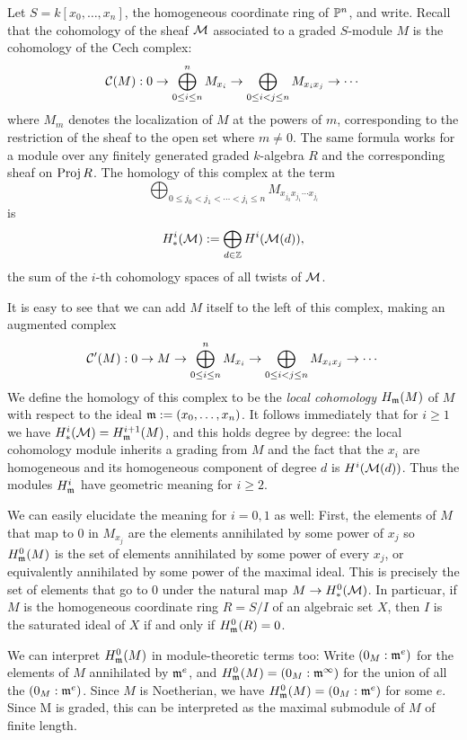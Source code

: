 Let $S= k[x_{0}, \dots, x_{n}]$, the homogeneous coordinate ring of $\PP^{n}$, and write. Recall that the cohomology of the sheaf $\cM$ associated to a graded $S$-module $M$ is the cohomology of the Cech complex:
$$
\cC(M): 0\to \bigoplus_{0\leq i \leq n}^{n} M_{x_{i}} \to \bigoplus_{0\leq i<j\leq n} M_{x_{i}x_{j}} \to \cdots
$$
where $M_{m}$ denotes the localization of $M$ at the powers of $m$, corresponding to the restriction of the sheaf to the open set where $m \neq 0$. The same formula works for a module 
over any finitely generated graded $k$-algebra $R$ and the corresponding sheaf on $\Proj R$.
The homology of this complex at the term
$$
\bigoplus_{0\leq j_{0}<j_{1}<\cdots<j_{i}\leq n} M_{x_{j_{0}}x_{j_{1}}\cdots x_{j_{i}}}
$$
is 
$$
H^{i}_{*}(\cM):= \bigoplus_{d\in \ZZ} H^{i}(\cM(d)),
$$
the sum of the $i$-th cohomology spaces of all twists of $\cM$.

It is easy to see that we can add $M$ itself to the left of this complex, making an augmented complex
$$
\cC'(M): 0\to M \to \bigoplus_{0\leq i \leq n}^{n} M_{x_{i}} \to \bigoplus_{0\leq i<j\leq n} M_{x_{i}x_{j}} \to \cdots
$$
We define the homology of this complex to be the \emph{local cohomology} $H_{\gm}(M)$ of $M$ with respect to the ideal $\gm := (x_{0},\dots,x_{n})$. It follows immediately that for $i\geq 1$ we have
$H^{i}_{*}(\cM) = H^{i+1}_{\gm}(M)$, and this holds degree by degree: the local cohomology module inherits a grading from $M$ and the fact that the $x_{i}$ are homogeneous and its homogeneous component of degree $d$ is
$H^{i}(\cM(d))$. Thus the modules $H_{\gm}^{i}$ have geometric meaning for $i\geq 2$. 

We can easily elucidate the meaning for $i=0,1$ as well: First, the elements of $M$ that map to 0 in $M_{x_{j}}$ are the elements annihilated by some power of $x_{j}$ so $H^{0}_{\gm}(M)$ is the set of elements annihilated by some power of every $x_{j}$, or equivalently annihilated by some power of the maximal ideal. This is precisely the set of elements that go to 0 under the natural map
$M\to H^{0}_{*}(\cM)$.  In particuar, if
$M$ is the homogeneous coordinate ring $R = S/I$ of an algebraic set $X$, then $I$ is the saturated ideal of $X$ if and only if $H^{0}_{\gm}(R) = 0$.

We can interpret $H^{0}_{\gm}(M)$ in module-theoretic terms too: Write 
$(0_{M}:\gm^{e})$ for the elements of $M$ annihilated by $\gm^{e}$, and 
$H^{0}_{\gm}(M) =(0_{M}:\gm^{\infty})$ for the union of all the $(0_{M}:\gm^{e})$. Since $M$ is Noetherian, we have
$H^{0}_{\gm}(M) =(0_{M}:\gm^{e})$ for some $e$.  Since M is graded, this can be interpreted as the maximal submodule of $M$ of finite length. 

